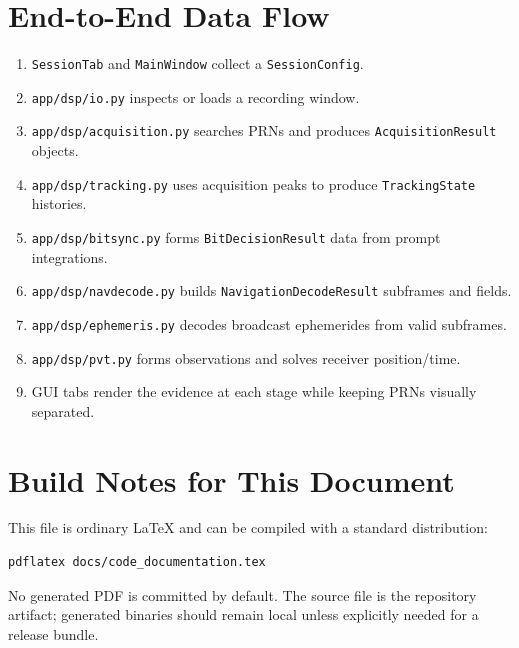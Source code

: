\documentclass[11pt,a4paper]{article}
\newcommand{\codepath}[1]{\nolinkurl{#1}}
\begin{document}
\section{End-to-End Data Flow}

\begin{enumerate}
  \item \texttt{SessionTab} and \texttt{MainWindow} collect a \texttt{SessionConfig}.
  \item \codepath{app/dsp/io.py} inspects or loads a recording window.
  \item \codepath{app/dsp/acquisition.py} searches PRNs and produces \texttt{AcquisitionResult} objects.
  \item \codepath{app/dsp/tracking.py} uses acquisition peaks to produce \texttt{TrackingState} histories.
  \item \codepath{app/dsp/bitsync.py} forms \texttt{BitDecisionResult} data from prompt integrations.
  \item \codepath{app/dsp/navdecode.py} builds \texttt{NavigationDecodeResult} subframes and fields.
  \item \codepath{app/dsp/ephemeris.py} decodes broadcast ephemerides from valid subframes.
  \item \codepath{app/dsp/pvt.py} forms observations and solves receiver position/time.
  \item GUI tabs render the evidence at each stage while keeping PRNs visually separated.
\end{enumerate}

\section{Build Notes for This Document}

This file is ordinary LaTeX and can be compiled with a standard distribution:

\begin{lstlisting}[style=pythonapi]
pdflatex docs/code_documentation.tex
\end{lstlisting}

No generated PDF is committed by default. The source file is the repository artifact; generated binaries should remain local unless explicitly needed for a release bundle.
\end{document}
